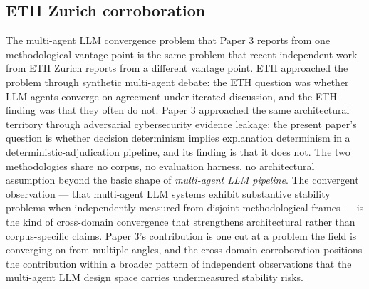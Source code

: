 \documentclass[sigconf,anonymous,review,nonacm=false]{acmart}
\begin{document}
\subsection{ETH Zurich corroboration}
The multi-agent LLM convergence problem that Paper 3 reports from one methodological vantage point is the same problem that recent independent work from ETH Zurich \citep{berdoz-rugli-wattenhofer-2026} reports from a different vantage point. ETH approached the problem through synthetic multi-agent debate: the ETH question was whether LLM agents converge on agreement under iterated discussion, and the ETH finding was that they often do not. Paper 3 approached the same architectural territory through adversarial cybersecurity evidence leakage: the present paper's question is whether decision determinism implies explanation determinism in a deterministic-adjudication pipeline, and its finding is that it does not. The two methodologies share no corpus, no evaluation harness, no architectural assumption beyond the basic shape of \textit{multi-agent LLM pipeline}. The convergent observation — that multi-agent LLM systems exhibit substantive stability problems when independently measured from disjoint methodological frames — is the kind of cross-domain convergence that strengthens architectural rather than corpus-specific claims. Paper 3's contribution is one cut at a problem the field is converging on from multiple angles, and the cross-domain corroboration positions the contribution within a broader pattern of independent observations that the multi-agent LLM design space carries undermeasured stability risks.
\end{document}
